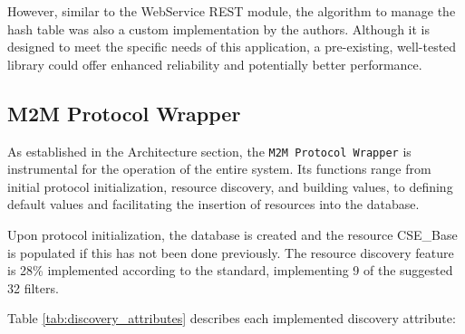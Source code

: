 \documentclass[a4paper,fleqn]{cas-dc}
\begin{document}
However, similar to the WebService REST module, the algorithm to manage the hash table was also a custom implementation by the authors. Although it is designed to meet the specific needs of this application, a pre-existing, well-tested library could offer enhanced reliability and potentially better performance.

\subsection{M2M Protocol Wrapper}

As established in the Architecture section, the \texttt{M2M Protocol Wrapper} is instrumental for the operation of the entire system. Its functions range from initial protocol initialization, resource discovery, and building values, to defining default values and facilitating the insertion of resources into the database.

Upon protocol initialization, the database is created and the resource CSE\_Base is populated if this has not been done previously. The resource discovery feature is 28\% implemented according to the standard, implementing 9 of the suggested 32 filters.

Table \ref{tab:discovery_attributes} describes each implemented discovery attribute:
\end{document}
